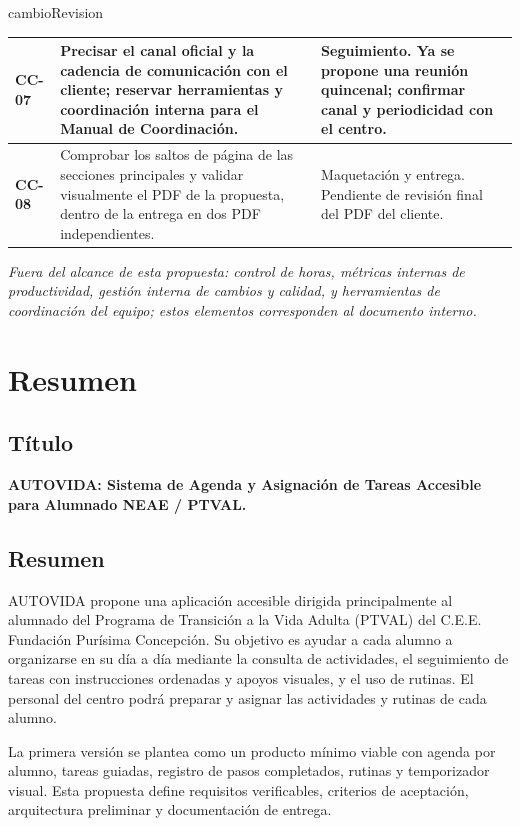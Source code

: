 \begin{cambiocontenido}{cambioRevision}
\begin{tabularx}{\textwidth}{|>{\centering\arraybackslash}p{1.25cm}|>{\raggedright\arraybackslash}p{7.3cm}|>{\raggedright\arraybackslash}X|}
\hline
\textcolor[HTML]{5B5EA6}{\textbf{CC-07}} & \textcolor[HTML]{5B5EA6}{Precisar el canal oficial y la cadencia de comunicación con el cliente; reservar herramientas y coordinación interna para el Manual de Coordinación.} & \textcolor[HTML]{5B5EA6}{Seguimiento. Ya se propone una reunión quincenal; confirmar canal y periodicidad con el centro.} \\
\hline
\textcolor[HTML]{B22222}{\textbf{CC-08}} & \textcolor[HTML]{B22222}{Comprobar los saltos de página de las secciones principales y validar visualmente el PDF de la propuesta, dentro de la entrega en dos PDF independientes.} & \textcolor[HTML]{B22222}{Maquetación y entrega. Pendiente de revisión final del PDF del cliente.} \\
\hline
\end{tabularx}
\endgroup

\vspace{0.5em}
{\small\textit{Fuera del alcance de esta propuesta: control de horas, métricas internas de productividad, gestión interna de cambios y calidad, y herramientas de coordinación del equipo; estos elementos corresponden al documento interno.}}

\end{cambiocontenido}
\newpage
\section{Resumen}

\subsection{Título}
\textbf{AUTOVIDA: Sistema de Agenda y Asignación de Tareas Accesible para Alumnado NEAE / PTVAL.}

\subsection{Resumen}
AUTOVIDA propone una aplicación accesible dirigida principalmente al alumnado del Programa de Transición a la Vida Adulta (PTVAL) del C.E.E. Fundación Purísima Concepción. Su objetivo es ayudar a cada alumno a organizarse en su día a día mediante la consulta de actividades, el seguimiento de tareas con instrucciones ordenadas y apoyos visuales, y el uso de rutinas. El personal del centro podrá preparar y asignar las actividades y rutinas de cada alumno.

La primera versión se plantea como un producto mínimo viable con agenda por alumno, tareas guiadas, registro de pasos completados, rutinas y temporizador visual. Esta propuesta define requisitos verificables, criterios de aceptación, arquitectura preliminar y documentación de entrega.

